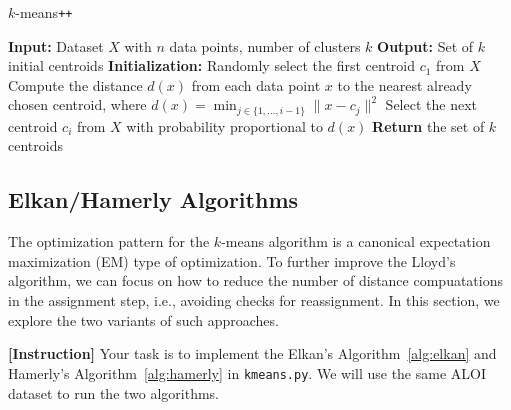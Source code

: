 \documentclass[12pt]{article}
\begin{document}
\begin{algorithm}[ht]
    \caption{$k$-means\texttt{++}}
    \label{alg:kmeanspp}
    \begin{algorithmic}[1]
        \STATE \textbf{Input:} Dataset $X$ with $n$ data points, number of clusters $k$
        \STATE \textbf{Output:} Set of $k$ initial centroids
        \STATE \textbf{Initialization:}
        \STATE Randomly select the first centroid $c_1$ from $X$
        \STATE Compute the distance $d(x)$ from each data point $x$ to the nearest already chosen centroid, where $d(x) = \min_{j \in \{1, \ldots, i-1\}} \|x - c_j\|^2$
        \STATE Select the next centroid $c_i$ from $X$ with probability proportional to $d(x)$
        \ENDFOR
        \STATE \textbf{Return} the set of $k$ centroids
    \end{algorithmic}
\end{algorithm}

\subsection{Elkan/Hamerly Algorithms}
The optimization pattern for the $k$-means algorithm is a canonical expectation maximization (EM) type of optimization.
To further improve the Lloyd's algorithm, we can focus on how to reduce the number of distance compuatations in the assignment step, i.e., avoiding checks for reassignment.
In this section, we explore the two variants of such approaches.

\smallskip\noindent
\textbf{[Instruction]}
Your task is to implement the Elkan's Algorithm~\ref{alg:elkan} and Hamerly's Algorithm~\ref{alg:hamerly} in \texttt{kmeans.py}.
We will use the same ALOI dataset to run the two algorithms.
\end{document}

